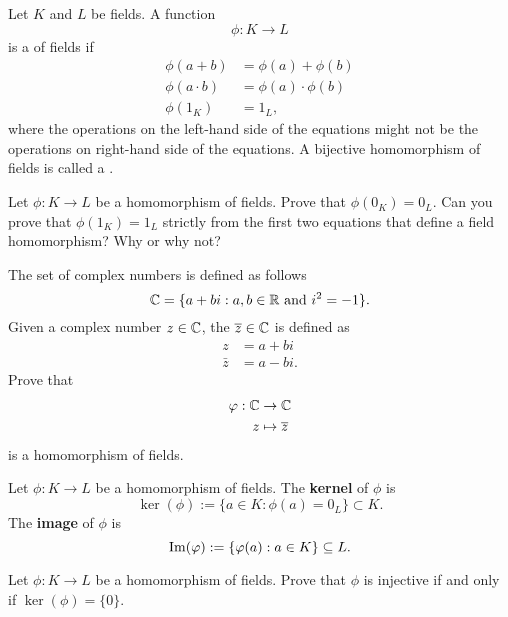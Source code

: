 \documentclass{ximera}
\begin{document}
\begin{definition}
  Let $K$ and $L$ be fields. A function
  \[
  \phi:K\to L
  \]
  is a  of fields if
  \begin{align*}
    \phi(a+b) &= \phi(a)+\phi(b)\\
    \phi(a\cdot b) &= \phi(a)\cdot \phi(b)\\
    \phi(1_K) &= 1_L,
  \end{align*}
  where the operations on the left-hand side of the equations might
  not be the operations on right-hand side of the equations. A
  bijective homomorphism of fields is called a .
\end{definition}

\begin{exercise}
  Let $\phi:K\to L$ be a homomorphism of fields. Prove that $\phi(0_K)
  = 0_L$. Can you prove that $\phi(1_K) = 1_L$ strictly from the first
  two equations that define a field homomorphism? Why or why not?
\end{exercise}

\begin{exercise}\label{E:cc}
  The set of complex numbers is defined as follows
  \[
  \mathbb C = \{ a + b i: \text{$a,b\in\mathbb R$ and $i^2 = -1$}\}.
  \]
  Given a complex number $z\in\mathbb C$, the 
  $\overline{z}\in\mathbb C$ is defined as
  \begin{align*}
    z &= a+bi\\
    \bar{z} &= a- bi.
  \end{align*}
  Prove that
  \begin{align*}
    \varphi:\mathbb C &\to\mathbb C\\
    z &\mapsto \overline{z}
  \end{align*}
  is a homomorphism of fields.
\end{exercise}



\begin{definition}
  Let $\phi: K\to L$ be a homomorphism of fields. The \textbf{kernel}
  of $\phi$ is
  \[
  \ker(\phi) := \{a\in K:\phi(a) = 0_L\}\subset K.
  \]
  The \textbf{image} of $\phi$ is
  \[
  \operatorname{Im}(\varphi) := \{\varphi(a):a\in K\}\subseteq L.
  \]
\end{definition}


\begin{exercise}
  Let $\phi:K\to L$ be a homomorphism of fields. Prove that $\phi$ is
  injective if and only if $\ker(\phi) = \{0\}$.
\end{exercise}
\end{document}
